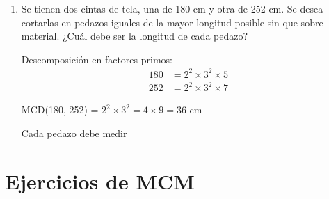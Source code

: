 \documentclass[12pt,a4paper]{article}
\begin{document}
\begin{enumerate}
    \item Se tienen dos cintas de tela, una de 180 cm y otra de 252 cm. Se desea cortarlas en pedazos iguales de la mayor longitud posible sin que sobre material. ¿Cuál debe ser la longitud de cada pedazo?

Descomposición en factores primos:
\begin{align*}
180 &= 2^2 \times 3^2 \times 5 \\
252 &= 2^2 \times 3^2 \times 7
\end{align*}

MCD(180, 252) = $2^2 \times 3^2 = 4 \times 9 = 36$ cm

Cada pedazo debe medir 
\end{enumerate}

\section{Ejercicios de MCM}
\end{document}
